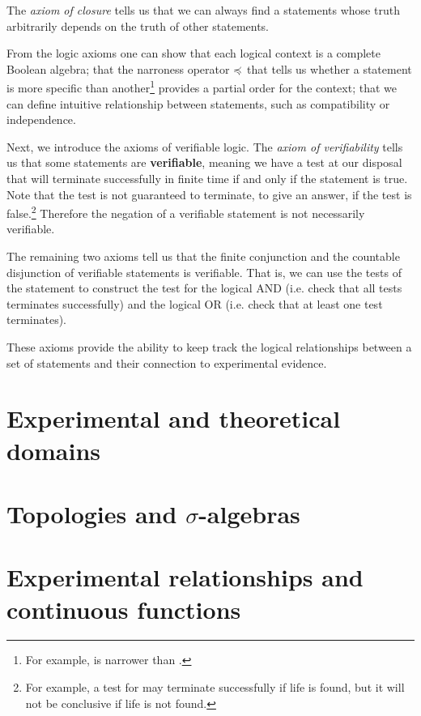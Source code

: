 \documentclass[10pt,twocolumn, nofootinbib]{revtex4-1}
\begin{document}
The \emph{axiom of closure} tells us that we can always find a statements whose truth arbitrarily depends on the truth of other statements.

From the logic axioms one can show that each logical context is a complete Boolean algebra; that the narroness operator $\preccurlyeq$ that tells us whether a statement is more specific than another\footnote{For example,  is narrower than .} provides a partial order for the context; that we can define intuitive relationship between statements, such as compatibility or independence.

Next, we introduce the axioms of verifiable logic. The \emph{axiom of verifiability} tells us that some statements are \textbf{verifiable}, meaning we have a test at our disposal that will terminate successfully in finite time if and only if the statement is true. Note that the test is not guaranteed to terminate, to give an answer, if the test is false.\footnote{For example, a test for  may terminate successfully if life is found, but it will not be conclusive if life is not found.} Therefore the negation of a verifiable statement is not necessarily verifiable.

The remaining two axioms tell us that the finite conjunction and the countable disjunction of verifiable statements is verifiable. That is, we can use the tests of the statement to construct the test for the logical AND (i.e. check that all tests terminates successfully) and the logical OR (i.e. check that at least one test terminates).

These axioms provide the ability to keep track the logical relationships between a set of statements and their connection to experimental evidence.

\section{Experimental and theoretical domains}



\section{Topologies and $\sigma$-algebras}

\section{Experimental relationships and continuous functions}


\end{document}

